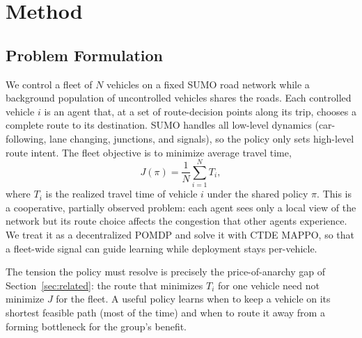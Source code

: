 \section{Method}

\subsection{Problem Formulation}
We control a fleet of $N$ vehicles on a fixed SUMO road network while a background
population of uncontrolled vehicles shares the roads. Each controlled vehicle $i$ is an
agent that, at a set of route-decision points along its trip, chooses a complete route to
its destination. SUMO handles all low-level dynamics (car-following, lane changing,
junctions, and signals), so the policy only sets high-level route intent. The fleet
objective is to minimize average travel time,
\begin{equation}
  J(\pi) = \frac{1}{N}\sum_{i=1}^{N} T_i,
\end{equation}
where $T_i$ is the realized travel time of vehicle $i$ under the shared policy $\pi$.
This is a cooperative, partially observed problem: each agent sees only a local view of
the network but its route choice affects the congestion that other agents experience.
We treat it as a decentralized POMDP and solve it with CTDE MAPPO, so that a fleet-wide
signal can guide learning while deployment stays per-vehicle.

The tension the policy must resolve is precisely the price-of-anarchy gap of
Section~\ref{sec:related}: the route that minimizes $T_i$ for one vehicle need not minimize $J$ for the
fleet. A useful policy learns when to keep a vehicle on its shortest feasible path
(most of the time) and when to route it away from a forming bottleneck for the group's
benefit.

